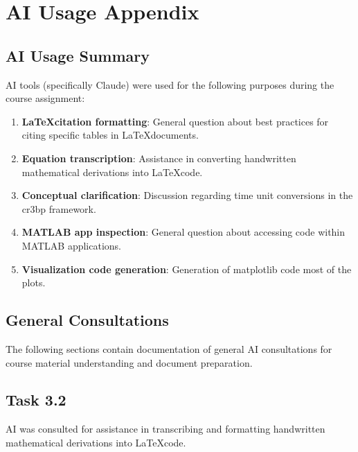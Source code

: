 \chapter{AI Usage Appendix}
\label{chapter:ai-usage}

\section{AI Usage Summary}

AI tools (specifically Claude) were used for the following purposes during the course assignment:

\begin{enumerate}
	\item \textbf{\LaTeX citation formatting}: General question about best practices for citing specific tables in \LaTeX documents.
	\item \textbf{Equation transcription}: Assistance in converting handwritten mathematical derivations into \LaTeX code.
	\item \textbf{Conceptual clarification}: Discussion regarding time unit conversions in the \ac{cr3bp} framework.
	\item \textbf{MATLAB app inspection}: General question about accessing code within MATLAB applications.
	\item \textbf{Visualization code generation}: Generation of matplotlib code most of the plots.
\end{enumerate}

\section{General Consultations}

The following sections contain documentation of general AI consultations for course material understanding and document preparation.



\newpage



\section{Task 3.2}

AI was consulted for assistance in transcribing and formatting handwritten mathematical derivations into \LaTeX code.

